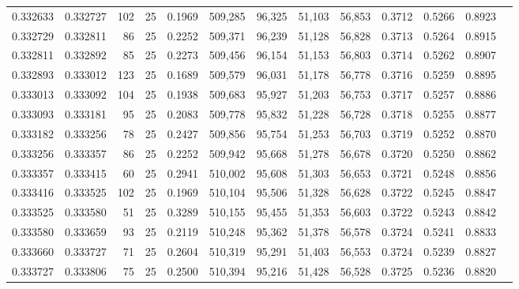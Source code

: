\begin{tabular}{rrrrrrrrrrrrr}
0.332633 & 0.332727 &   102 &  25 &                                     0.1969 & 509,285 &  96,325 &  51,103 &  56,853 & 0.3712 & 0.5266 & 0.8923 \\
0.332729 & 0.332811 &    86 &  25 &                                     0.2252 & 509,371 &  96,239 &  51,128 &  56,828 & 0.3713 & 0.5264 & 0.8915 \\
0.332811 & 0.332892 &    85 &  25 &                                     0.2273 & 509,456 &  96,154 &  51,153 &  56,803 & 0.3714 & 0.5262 & 0.8907 \\
0.332893 & 0.333012 &   123 &  25 &                                     0.1689 & 509,579 &  96,031 &  51,178 &  56,778 & 0.3716 & 0.5259 & 0.8895 \\
0.333013 & 0.333092 &   104 &  25 &                                     0.1938 & 509,683 &  95,927 &  51,203 &  56,753 & 0.3717 & 0.5257 & 0.8886 \\
0.333093 & 0.333181 &    95 &  25 &                                     0.2083 & 509,778 &  95,832 &  51,228 &  56,728 & 0.3718 & 0.5255 & 0.8877 \\
0.333182 & 0.333256 &    78 &  25 &                                     0.2427 & 509,856 &  95,754 &  51,253 &  56,703 & 0.3719 & 0.5252 & 0.8870 \\
0.333256 & 0.333357 &    86 &  25 &                                     0.2252 & 509,942 &  95,668 &  51,278 &  56,678 & 0.3720 & 0.5250 & 0.8862 \\
0.333357 & 0.333415 &    60 &  25 &                                     0.2941 & 510,002 &  95,608 &  51,303 &  56,653 & 0.3721 & 0.5248 & 0.8856 \\
0.333416 & 0.333525 &   102 &  25 &                                     0.1969 & 510,104 &  95,506 &  51,328 &  56,628 & 0.3722 & 0.5245 & 0.8847 \\
0.333525 & 0.333580 &    51 &  25 &                                     0.3289 & 510,155 &  95,455 &  51,353 &  56,603 & 0.3722 & 0.5243 & 0.8842 \\
0.333580 & 0.333659 &    93 &  25 &                                     0.2119 & 510,248 &  95,362 &  51,378 &  56,578 & 0.3724 & 0.5241 & 0.8833 \\
0.333660 & 0.333727 &    71 &  25 &                                     0.2604 & 510,319 &  95,291 &  51,403 &  56,553 & 0.3724 & 0.5239 & 0.8827 \\
0.333727 & 0.333806 &    75 &  25 &                                     0.2500 & 510,394 &  95,216 &  51,428 &  56,528 & 0.3725 & 0.5236 & 0.8820 \\

\end{tabular}

